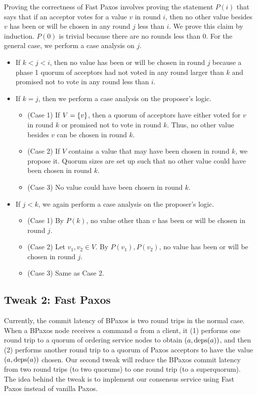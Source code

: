 \documentclass{mwhittaker}
\begin{document}
Proving the correctness of Fast Paxos involves proving the statement $P(i)$
that says that if an acceptor votes for a value $v$ in round $i$, then no
other value besides $v$ has been or will be chosen in any round $j$ less than
$i$. We prove this claim by induction. $P(0)$ is trivial because there are no
rounds less than $0$. For the general case, we perform a case analysis on $j$.
\begin{itemize}
  \item
    If $k < j < i$, then no value has been or will be chosen in round $j$
    because a phase 1 quorum of acceptors had not voted in any round larger
    than $k$ and promised not to vote in any round less than $i$.

  \item
    If $k = j$, then we perform a case analysis on the proposer's logic.
    \begin{itemize}
      \item
        (Case 1) If $V = \{v\}$, then a quorum of acceptors have either voted
        for $v$ in round $k$ or promised not to vote in round $k$. Thus, no
        other value besides $v$ can be chosen in round $k$.
      \item
        (Case 2) If $V$ contains a value that may have been chosen in round
        $k$, we propose it. Quorum sizes are set up such that no other value
        could have been chosen in round $k$.
      \item
        (Case 3) No value could have been chosen in round $k$.
    \end{itemize}

  \item
    If $j < k$, we again perform a case analysis on the proposer's logic.
    \begin{itemize}
      \item
        (Case 1) By $P(k)$, no value other than $v$ has been or will be chosen
        in round $j$.
      \item
        (Case 2) Let $v_1, v_2 \in V$. By $P(v_1), P(v_2)$, no value has been
        or will be chosen in round $j$.
      \item
        (Case 3) Same as Case 2.
    \end{itemize}
\end{itemize}

\subsection{Tweak 2: Fast Paxos}
Currently, the commit latency of BPaxos is two round trips in the normal case.
When a BPaxos node receives a command $a$ from a client, it (1) performs one
round trip to a quorum of ordering service nodes to obtain $(a, \text{deps}(a))$, and
then (2) performs another round trip to a quorum of Paxos acceptors to have the
value $(a, \text{deps}(a))$ chosen. Our second tweak will reduce the BPaxos commit
latency from two round trips (to two quorums) to one round trip (to a
superquorum). The idea behind the tweak is to implement our consensus service
using Fast Paxos instead of vanilla Paxos.
\end{document}
